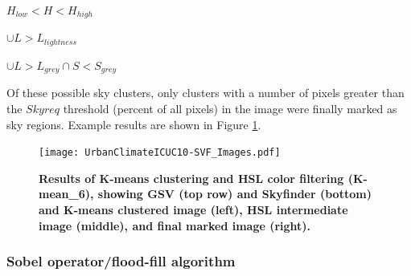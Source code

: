 \documentclass[final,3p,times,authoryear]{elsarticle}
\begin{document}
$H_{low} < H < H_{high}$

$\cup L > L_{lightness}$

$\cup L > L_{grey} \cap S < S_{grey}$

Of these possible sky clusters, only clusters with a number of pixels greater than the $Skyreq$ threshold (percent of all pixels) in the image were finally marked as sky regions. Example results are shown in Figure \ref{fig:kmeansresults}. 


\begin{figure}
\centering 
\texttt{[image: UrbanClimateICUC10-SVF\_Images.pdf]}
\caption{\bf Results of K-means clustering and HSL color filtering (K-mean\_6), showing GSV (top row) and Skyfinder (bottom) and K-means clustered image (left), HSL intermediate image (middle), and final marked image (right).}    
 \label{fig:kmeansresults}  
\end{figure} 



\subsubsection{\cite{Middel2018} Sobel operator/flood-fill algorithm}\label{sec:floodfill}
\end{document}
